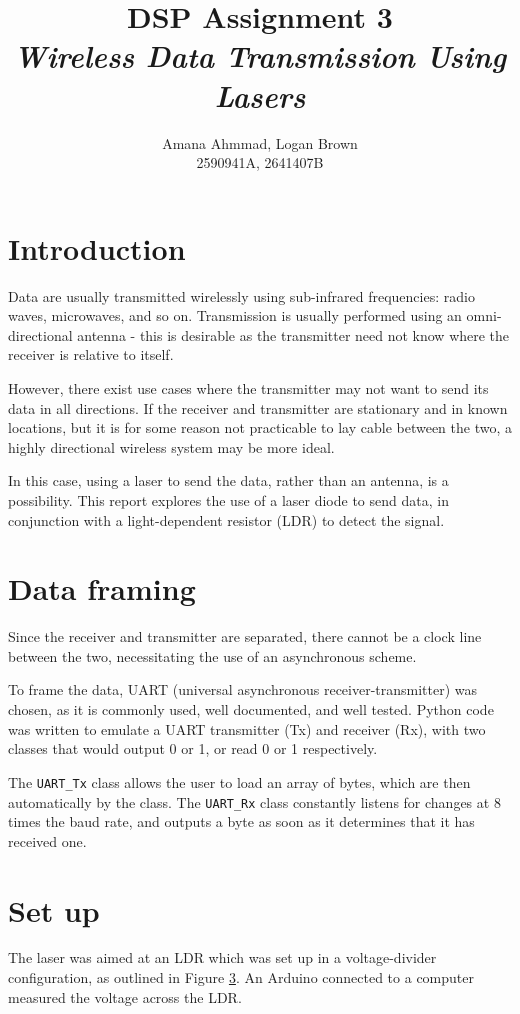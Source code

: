 \documentclass{article}
\title{DSP Assignment 3 \\ \textit{Wireless Data Transmission Using Lasers}}
\author{Amana Ahmmad, Logan Brown \\ 2590941A, 2641407B}
\begin{document}
\maketitle

\begin{multicols}{2}

\section{Introduction}
Data are usually transmitted wirelessly using sub-infrared frequencies: radio waves, microwaves, and so on. Transmission is usually performed using an omni-directional antenna - this is desirable as the transmitter need not know where the receiver is relative to itself.  

However, there exist use cases where the transmitter may not want to send its data in all directions. If the receiver and transmitter are stationary and in known locations, but it is for some reason not practicable to lay cable between the two, a highly directional wireless system may be more ideal. 

In this case, using a laser to send the data, rather than an antenna, is a possibility. This report explores the use of a laser diode to send data, in conjunction with a light-dependent resistor (LDR) to detect the signal.

\section{Data framing}
Since the receiver and transmitter are separated, there cannot be a clock line between the two, necessitating the use of an asynchronous scheme. 

To frame the data, UART (universal asynchronous receiver-transmitter) was chosen, as it is commonly used, well documented, and well tested. Python code was written to emulate a UART transmitter (Tx) and receiver (Rx), with two classes that would output 0 or 1, or read 0 or 1 respectively.

The \texttt{UART\_Tx} class allows the user to load an array of bytes, which are then  automatically by the class. The \texttt{UART\_Rx} class constantly listens for changes at 8 times the baud rate, and outputs a byte as soon as it determines that it has received one.

\section{Set up}
The laser was aimed at an LDR which was set up in a voltage-divider configuration, as outlined in Figure \ref{}. An Arduino connected to a computer measured the voltage across the LDR.


\end{multicols}
\end{document}
